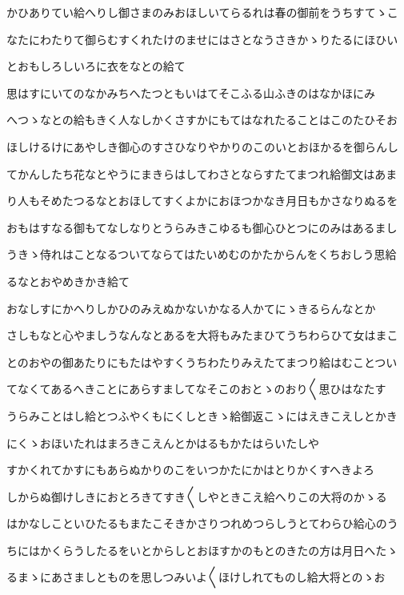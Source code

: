\documentclass[a4paper,11pt,landscape]{ltjtarticle}
\begin{document}
\par\medskip
かひありてい給へりし御さまのみおほしいてらるれは春の御前をうちすてゝこ
\par\medskip
なたにわたりて御らむすくれたけのませにはさとなうさきかゝりたるにほひい
\par\medskip
とおもしろしいろに衣をなとの給て
\par\medskip
思はすにいてのなかみちへたつともいはてそこふる山ふきのはなかほにみ
\par\medskip
へつゝなとの給もきく人なしかくさすかにもてはなれたることはこのたひそお
\par\medskip
ほしけるけにあやしき御心のすさひなりやかりのこのいとおほかるを御らんし
\par\medskip
てかんしたち花なとやうにまきらはしてわさとならすたてまつれ給御文はあま
\par\medskip
り人もそめたつるなとおほしてすくよかにおほつかなき月日もかさなりぬるを
\par\medskip
おもはすなる御もてなしなりとうらみきこゆるも御心ひとつにのみはあるまし
\par\medskip
うきゝ侍れはことなるついてならてはたいめむのかたからんをくちおしう思給
\par\medskip
るなとおやめきかき給て
\par\medskip
おなしすにかへりしかひのみえぬかないかなる人かてにゝきるらんなとか
\par\medskip
さしもなと心やましうなんなとあるを大将もみたまひてうちわらひて女はまこ
\par\medskip
とのおやの御あたりにもたはやすくうちわたりみえたてまつり給はむことつい
\par\medskip
てなくてあるへきことにあらすましてなそこのおとゝのおり〱思ひはなたす
\par\medskip
うらみことはし給とつふやくもにくしときゝ給御返こゝにはえきこえしとかき
\par\medskip
にくゝおほいたれはまろきこえんとかはるもかたはらいたしや
\par\medskip
すかくれてかすにもあらぬかりのこをいつかたにかはとりかくすへきよろ
\par\medskip
しからぬ御けしきにおとろきてすき〱しやときこえ給へりこの大将のかゝる
\par\medskip
はかなしこといひたるもまたこそきかさりつれめつらしうとてわらひ給心のう
\par\medskip
ちにはかくらうしたるをいとからしとおほすかのもとのきたの方は月日へたゝ
\par\medskip
るまゝにあさましとものを思しつみいよ〱ほけしれてものし給大将とのゝお
\end{document}
